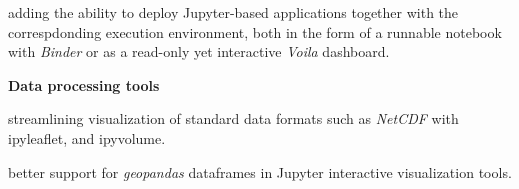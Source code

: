 \begin{task}[
  title=Demonstrator: Geosciences,
  id=geoscience,
  lead=UIO,
  PM=22,
  wphases={0-48},
  partners={EGI,QS,SRL,UPSUD}
]
\begin{compactitem}

  \item adding the ability to deploy Jupyter-based applications together with
    the correspdonding execution environment, both in the form of a runnable
    notebook with \emph{Binder} or as a read-only yet interactive \emph{Voila}
    dashboard.
\end{compactitem}

\textbf{Data processing tools}

\begin{compactitem}
  \item streamlining visualization of standard data formats such as \emph{NetCDF}
  with ipyleaflet, and ipyvolume.

  \item better support for \emph{geopandas} dataframes in Jupyter interactive
  visualization tools.
\end{compactitem}
\end{task}
